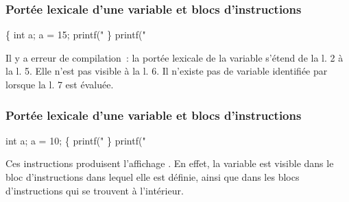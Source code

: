\begin{frame}[fragile]
\frametitle{Portée lexicale d'une variable et blocs d'instructions}
\begin{multicols}{2}
\begin{semiverbatim}
\{
    int a;
    a = 15;
    printf("%
\}
printf("%
\end{semiverbatim}
Il y a erreur de compilation~: la portée
lexicale de la variable  s'étend de la l. 2 à la l. 5.
Elle n'est pas visible à la l. 6. Il n'existe
pas de variable identifiée par  lorsque la l. 7 est évaluée.
\end{multicols}
\smallskip

\begin{multicols}{2}
\begin{semiverbatim}\small{}
\end{semiverbatim}
\end{multicols}
\end{frame}

\begin{frame}[fragile]
\frametitle{Portée lexicale d'une variable et blocs d'instructions}
\begin{multicols}{2}
\begin{semiverbatim}
int a;
a = 10;
\{
    printf("%
\}
printf("%
\end{semiverbatim}
\medskip

Ces instructions produisent l'affichage . En effet, la
variable  est visible dans le bloc d'instructions dans lequel
elle est définie, ainsi que dans les blocs d'instructions qui se trouvent
à l'intérieur.
\end{multicols}
\smallskip

\begin{multicols}{2}
\end{multicols}
\end{frame}

